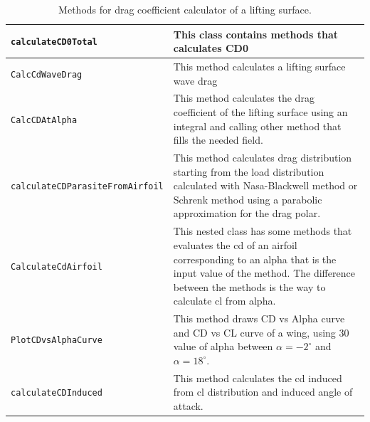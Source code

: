 \begin{table}[H]
\begin{tabular}{p{7cm}p{7.5cm}}
\toprule
\lstinline[language=Java]!calculateCD0Total! & This class contains methods that calculates CD0\\ \hline 
\lstinline[language=Java]!CalcCdWaveDrag! & This method calculates a lifting surface wave drag\\ \hline 
\lstinline[language=Java]!CalcCDAtAlpha! & This method calculates the drag coefficient of the lifting surface using an integral and calling other method that fills the needed field. \\ \hline 
\lstinline[language=Java]!calculateCDParasiteFromAirfoil! &This method calculates drag distribution starting from the load distribution calculated with Nasa-Blackwell method or Schrenk method using a parabolic approximation for the drag polar.  
\\ \hline 
\lstinline[language=Java]!CalculateCdAirfoil! & This nested class has some methods that evaluates the cd of an airfoil corresponding to an alpha that is the input value of the method. The difference between the methods is the way to calculate cl from alpha.\\ \hline 
\lstinline[language=Java]!PlotCDvsAlphaCurve! & This method draws CD vs Alpha curve and CD vs CL curve of a wing, using 30 value of alpha between $\alpha=- 2^{\circ}$ and $\alpha = 18^{\circ}$.\\ \hline 
\lstinline[language=Java]!calculateCDInduced! & This method calculates the cd induced from cl distribution and induced angle of attack. \\ \hline 
\bottomrule
\end{tabular}
\caption{Methods for drag coefficient calculator of a lifting surface.}
\label{table:Table2}
\end{table}

